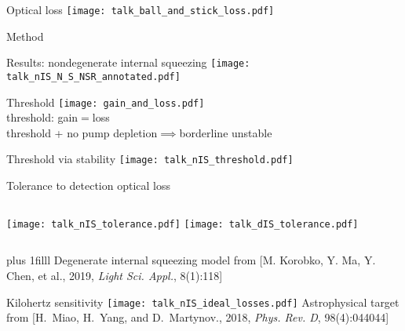 \documentclass[12pt,xcolor=dvipsnames]{beamer}
\begin{document}
\begin{frame}{Optical loss}
\centering
{
\texttt{[image: talk\_ball\_and\_stick\_loss.pdf]}
\hspace*{1cm}
}
\end{frame}

\begin{frame}{Method} 
\end{frame}

\begin{frame}{Results: nondegenerate internal squeezing}
\centering
\texttt{[image: talk\_nIS\_N\_S\_NSR\_annotated.pdf]}
\end{frame}

\begin{frame}{Threshold}
\centering
\texttt{[image: gain\_and\_loss.pdf]}
\\\vspace*{1cm}
\large{threshold: gain$=$loss}
\\\vspace*{0.5cm}threshold + no pump depletion$\implies$borderline unstable
\end{frame}

\begin{frame}{Threshold via stability}
\centering
\texttt{[image: talk\_nIS\_threshold.pdf]}
\end{frame}

\begin{frame}{Tolerance to detection optical loss}
\begin{columns}
\centering
\texttt{[image: talk\_nIS\_tolerance.pdf]}
\centering
\hspace*{-.3cm}
\texttt{[image: talk\_dIS\_tolerance.pdf]} %
\end{columns}
\vskip0pt plus 1filll
\centering
{\tiny Degenerate internal squeezing model from [M. Korobko, Y. Ma, Y. Chen, et al., 2019, \emph{Light Sci. Appl.}, 8(1):118]}\\
\end{frame}

\begin{frame}{Kilohertz sensitivity}
\centering
\texttt{[image: talk\_nIS\_ideal\_losses.pdf]}
{\tiny\vspace{-0.2cm}Astrophysical target from [H.~Miao, H.~Yang, and D.~Martynov., 2018, \emph{Phys. Rev. D}, 98(4):044044]}
\end{frame}
\end{document}
